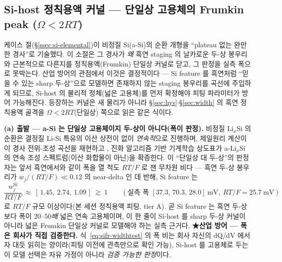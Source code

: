 \subsection{Si-host 정칙용액 커널 --- 단일상 고용체의 Frumkin peak ($\Omega<2RT$)}\label{ssec:si-frumkin}
케이스 절(\S\ref{ssec:si-elemental})이 비정질 Si(a-Si)의 순환 개형을 ``plateau 없는 완만한 경사''로 기술했다.
이 소절은 그 경사가 \emph{왜} 흑연 staging 의 날카로운 두-상 봉우리와 근본적으로 다른지를 정칙용액(Frumkin)
단일상 커널로 닫고, 그 판정을 실측 폭으로 못박는다. 산업 방어의 관점에서 이것은 결정적이다 --- Si feature 를
흑연처럼 ``믿을 수 있는 sharp 두-상''으로 모델하면 존재하지 않는 staging 봉우리를 곡선에 주입하게 되므로, Si-host
의 물리적 정체(넓은 고용체)를 먼저 확정해야 피팅 파라미터가 방어 가능해진다. 등장하는 커널은 새 물리가 아니라
\S\ref{sec:hys}$\cdot$\S\ref{sec:width} 의 흑연 정칙용액 골격을 $\Omega<2RT$(단일상) 쪽으로 읽은 같은 식이다.

\textbf{(a) 출발 --- a-Si 는 단일상 고용체이지 두-상이 아니다(폭이 판정).} 비정질 Li$_x$Si 의 순환은 결정질
Li-Si 특유의 이산 상전이 없이 \emph{연속적}으로 진행하며, 제일원리 계산이 이 경사 전위-조성 곡선을 재현하고
\cite{chevrier_dahn2009}, 진화 알고리즘 기반 기계학습 상도표가 a-Li$_x$Si 의 연속 조성 스펙트럼(이산 화합물이
아닌)을 확증한다\cite{artrith2018}. 이 ``단일상 대 두-상''의 판정자는 앞서 흑연에서와 같이 폭을 열 척도
$RT/F$ 로 잰 무차원 비다 --- 흑연 두-상 봉우리가 $w_j/(RT/F)\ll0.12$ 의 near-delta 인 데 반해, Si feature 는
\begin{equation}
\frac{w_j^{\mathrm{Si}}}{RT/F}\ \approx\ [\,1.45,\ 2.74,\ 1.09\,]\ \gtrsim\ 1
\qquad(\text{실측 폭 } [37.3,\,70.3,\,28.0]\ \mathrm{mV},\ RT/F{=}25.7\ \mathrm{mV})
\label{eq:sifr-widthtest}
\end{equation}
로 $RT/F$ 규모 이상이다(본 세션 정칙용액 피팅, tier A). 곧 Si feature 는 흑연 두-상보다 폭이 \emph{$20$--$50$배}
넓은 연속 고용체이며, 이 한 줄이 Si-host 를 sharp 두-상 커널이 아니라 넓은 Frumkin 단일상 커널로 모델해야
하는 실측 근거다. \textbf{★산업 방어 --- 폭은 회사가 직접 검증한다.} 식~\eqref{eq:sifr-widthtest} 의 폭 비는
회사 자신의 dQ/dV 에서 자 대듯 읽히는 양이라(피팅 이전에 관측만으로 확인 가능), Si-host 를 고용체로 두는 이
모델 선택은 자유 가정이 아니라 \emph{검증 가능한 판정}이다.

